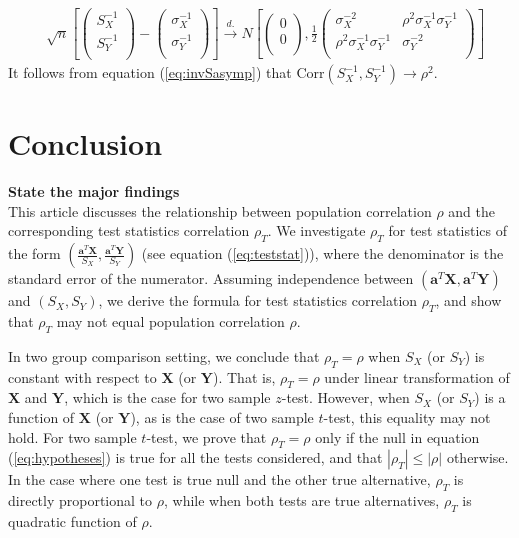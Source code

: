 \documentclass[12pt, a4paper]{article}
\newcommand{\cor}{\text{Corr}}
\begin{document}
		\begin{equation}\label{eq:invSasymp}
		\begin{aligned}
		& \sqrt{n}\left[\left( \begin{array}{c}
		S_X^{-1}\\
		S_Y^{-1}\\
		\end{array}\right)
		-
		\left( \begin{array}{c}
		\sigma_X^{-1}\\
		\sigma_Y^{-1}\\
		\end{array}\right)
		\right]
		\stackrel{d.}{\longrightarrow} 
		N\left[
		\left(\begin{array}{c}
		0\\
		0\\
		\end{array} \right), 
		\frac{1}{2}\left(
		\begin{array}{cc}
		\sigma_X^{-2} &\rho^2\sigma_X^{-1}\sigma_Y^{-1} \\
		\rho^2\sigma_X^{-1}\sigma_Y^{-1}  &\sigma_Y^{-2} \\
		\end{array}
		\right)
		\right] 
		\end{aligned}
		\end{equation}
	It follows from equation (\ref{eq:invSasymp}) that $\cor(S_X^{-1}, S_Y^{-1}) \rightarrow \rho^2$.
	
	
	
	\section{Conclusion}
	
	\textbf{State the major findings} \\
	This article discusses the relationship between population correlation $\rho$ and the corresponding test statistics correlation $\rho_T$. We investigate $\rho_T$ for test statistics of the form $(\frac{\bm a^T\bm X}{S_X}, \frac{\bm a^T\bm Y}{S_Y})$ (see equation (\ref{eq:teststat})), where the denominator is the standard error of the numerator. Assuming independence between $(\bm a^T\bm X, \bm a^T\bm Y)$ and $(S_X, S_Y)$, we derive the formula for test statistics correlation $\rho_T$, and show that $\rho_T$ may not equal population correlation $\rho$.  
	
	In two group comparison setting, we conclude that $\rho_T = \rho$ when $S_X$ (or $S_Y$) is constant with respect to $\bm X$ (or $\bm Y$). That is, $\rho_T = \rho$ under linear transformation of $\bm X$ and $\bm Y$, which is the case for two sample $z$-test. However, when $S_X$ (or $S_Y$) is a function of $\bm X$ (or $\bm Y$), as is the case of two
	sample $t$-test, this equality may not hold. For two sample $t$-test, we prove that $\rho_T=\rho$ only if the null in equation (\ref{eq:hypotheses}) is true for all the tests considered, and that $|\rho_T|\leq |\rho|$ otherwise. In the case where one test is true null and the other true alternative, $\rho_T$ is directly proportional to $\rho$, while when both tests are true alternatives, $\rho_T$ is quadratic function of $\rho$.
	
\end{document}

